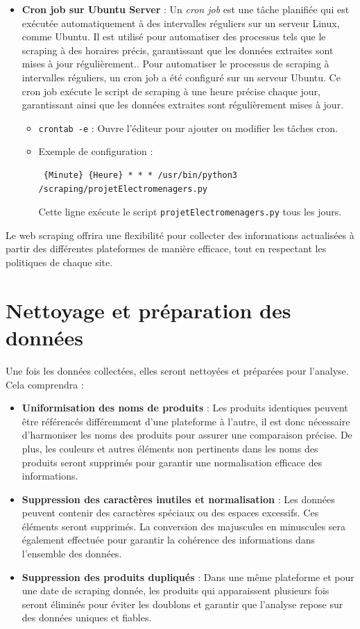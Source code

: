 \documentclass[a4paper, 12pt, oneside]{report}
\begin{document}
\begin{itemize}
\begin{itemize}
    \item \textbf{Cron job sur Ubuntu Server} : Un \textit{cron job} est une tâche planifiée qui est exécutée automatiquement à des intervalles réguliers sur un serveur Linux, comme Ubuntu. Il est utilisé pour automatiser des processus tels que le scraping à des horaires précis, garantissant que les données extraites sont mises à jour régulièrement.\cite{CronjobSource}. Pour automatiser le processus de scraping à intervalles réguliers, un cron job a été configuré sur un serveur Ubuntu. Ce cron job exécute le script de scraping à une heure précise chaque jour, garantissant ainsi que les données extraites sont régulièrement mises à jour.
        \begin{itemize}

            \item \texttt{crontab -e} : Ouvre l'éditeur pour ajouter ou modifier les tâches cron.
            \item Exemple de configuration : 
            \begin{verbatim} {Minute} {Heure} * * * /usr/bin/python3 /scraping/projetElectromenagers.py
            \end{verbatim}
            Cette ligne exécute le script \texttt{projetElectromenagers.py} tous les jours.
        \end{itemize}
    \end{itemize}
\end{itemize}

Le web scraping offrira une flexibilité pour collecter des informations actualisées à partir des différentes plateformes de manière efficace, tout en respectant les politiques de chaque site.

\section{Nettoyage et préparation des données}
Une fois les données collectées, elles seront nettoyées et préparées pour l’analyse. Cela comprendra :
\begin{itemize}
    \item \textbf{Uniformisation des noms de produits} : Les produits identiques peuvent être référencés différemment d’une plateforme à l’autre, il est donc nécessaire d’harmoniser les noms des produits pour assurer une comparaison précise. De plus, les couleurs et autres éléments non pertinents dans les noms des produits seront supprimés pour garantir une normalisation efficace des informations.
    \item \textbf{Suppression des caractères inutiles et normalisation} : Les données peuvent contenir des caractères spéciaux ou des espaces excessifs. Ces éléments seront supprimés. La conversion des majuscules en minuscules sera également effectuée pour garantir la cohérence des informations dans l'ensemble des données.
    \item \textbf{Suppression des produits dupliqués} : Dans une même plateforme et pour une date de scraping donnée, les produits qui apparaissent plusieurs fois seront éliminés pour éviter les doublons et garantir que l'analyse repose sur des données uniques et fiables.
\end{itemize}
\end{document}
